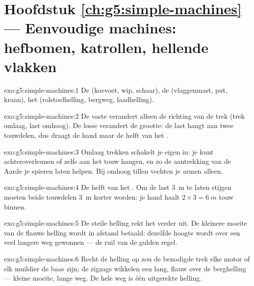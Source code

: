 \section*{Hoofdstuk \ref{ch:g5:simple-machines} --- Eenvoudige machines: hefbomen, katrollen, hellende vlakken}

\begin{solution}{exo:g5:simple-machines:1}
De  (koevoet, wip, schaar), de  (vlaggenmast, put,
kraan), het  (rolstoelhelling, bergweg, laadhelling).
\end{solution}

\begin{solution}{exo:g5:simple-machines:2}
De vaste  verandert alleen de richting van de trek (trek
omlaag, last omhoog). De losse  verandert de grootte: de last
hangt aan twee touwdelen, dus draagt de hand maar de helft van het
.
\end{solution}

\begin{solution}{exo:g5:simple-machines:3}
Omlaag trekken schakelt je eigen  in: je kunt achteroverleunen
of zelfs aan het touw hangen, en zo de aantrekking van de Aarde je
spieren laten helpen. Bij omhoog tillen vechten je armen alleen.
\end{solution}

\begin{solution}{exo:g5:simple-machines:4}
De helft van het . Om de last \qty{3}{m} te laten stijgen
moeten beide touwdelen \qty{3}{m} korter worden: je hand haalt
$2 \times 3 = \qty{6}{m}$ touw binnen.
\end{solution}

\begin{solution}{exo:g5:simple-machines:5}
De steile helling rekt het verder uit. De kleinere moeite van de
flauwe helling wordt in afstand betaald: dezelfde hoogte wordt over
een veel langere weg gewonnen --- de ruil van de gulden regel.
\end{solution}

\begin{solution}{exo:g5:simple-machines:6}
Recht de helling op zou de benodigde trek elke motor of elk muildier
de baas zijn; de zigzags wikkelen een lang, flauw  over de
berghelling --- kleine moeite, lange weg. De hele weg is één
uitgerekte helling.
\end{solution}

